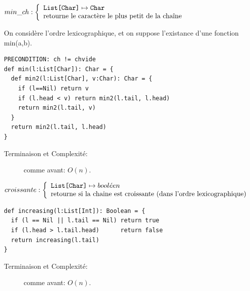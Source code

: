 \documentclass[10pt]{article}\usepackage[correction,nu]{esial}
\begin{document}
\begin{Question}
  $min\_ch: \left\{
    \begin{array}{l}
      \text{\texttt{List[Char]}}\mapsto \text{\texttt{Char}}\\
      \text{retourne le caractère le plus petit de la chaîne}
    \end{array}\right.$  
  
  \smallskip
  On considère l'ordre lexicographique, et on suppose l'existance d'une
  fonction min(a,b).
\end{Question}
\begin{Reponse}
  \begin{Verbatim}[label=min\_ch(ch)]
PRECONDITION: ch != chvide
def min(l:List[Char]): Char = {
  def min2(l:List[Char], v:Char): Char = {
    if (l==Nil) return v
    if (l.head < v) return min2(l.tail, l.head)
    return min2(l.tail, v)
  }
  return min2(l.tail, l.head)
}
  \end{Verbatim}

  \begin{description}
  \item[Terminaison et Complexité:] comme avant: $O(n)$. 
  \end{description}
\end{Reponse}

\begin{Question}
  $croissante: \left\{
    \begin{array}{l}
      \text{\texttt{List[Char]}}\mapsto bool\acute{e}en\\
      \text{retourne si la chaine est croissante (dans l'ordre lexicographique)}
    \end{array}\right.$  
\end{Question}
\begin{Reponse}
  \begin{Verbatim}[label=croissante(ch)]
def increasing(l:List[Int]): Boolean = {
  if (l == Nil || l.tail == Nil) return true
  if (l.head > l.tail.head)      return false
  return increasing(l.tail)
}
  \end{Verbatim}
  \begin{description}
  \item[Terminaison et Complexité:] comme avant: $O(n)$. 
  \end{description}
\end{Reponse}
\end{document}
